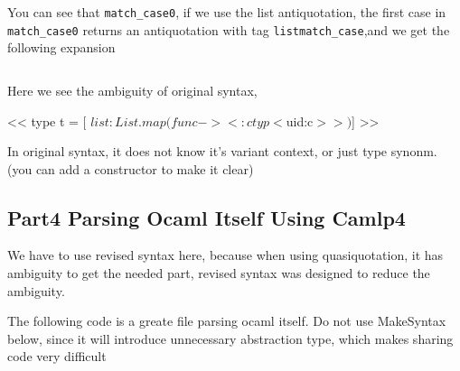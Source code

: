You can see that \verb|match_case0|, if we use the list antiquotation,
the first case in \verb|match_case0| returns an antiquotation with tag
\verb|listmatch_case|,and we get the following expansion


\inputminted[fontsize=\scriptsize, fontsize=\scriptsize, ]{ocaml}{camlp4/code/jake/antiquot_expander.ml}

Here we see the ambiguity of original syntax,

\begin{bluetext}
<< type t = [ $list:List.map (fun c -> <:ctyp< $uid:c$ >>)$]  >>
\end{bluetext}

In original syntax, it does not know it's variant context, or just
type synonm. (you can add a constructor to make it clear)

\subsection{Part4 Parsing Ocaml Itself Using Camlp4}

We have to use revised syntax here, because when using quasiquotation,
it has ambiguity to get the needed part, revised syntax was designed
to reduce the ambiguity. 

The following code is a greate file parsing ocaml itself.
Do not use MakeSyntax below, since it will introduce unnecessary
abstraction type, which makes sharing code very difficult

\inputminted[fontsize=\scriptsize, fontsize=\scriptsize, ]{ocaml}{camlp4/code/jake/otags.ml}


